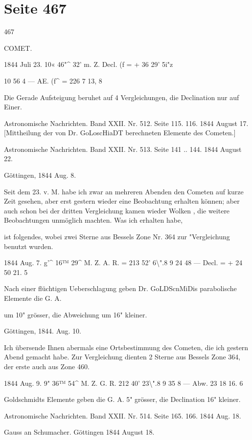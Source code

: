 \documentclass[10pt,a4paper]{article}
\begin{document}
\newpage
\section*{Seite 467}
467

COMET.

1844 Juli 23. 10« 46"\textasciicircum{} 32' m. Z. Decl. (f = + 36\textdegree{} 29' 5i"z

10 56 4 — AE. (f\textasciicircum{} = 226 7 13, 8

Die Gerade Aufsteigung beruhet auf 4 Vergleichungen, die Declination nur auf Einer.

Astronomische Nachrichten. Band XXII. Nr. 512. Seite 115. 116. 1844 August 17. [Mittheilung der von Dr. GoLoscHiaDT berechneten Elemente des Cometen.]

Astronomische Nachrichten. Band XXII. Nr. 513. Seite 141 .. 144. 1844 August 22.

Göttingen, 1844 Aug. 8.

Seit dem 23. v. M. habe ich zwar an mehreren Abenden den Cometen auf kurze Zeit gesehen, aber erst gestern wieder eine Beobachtung erhalten können; aber auch schon bei der dritten Vergleichung kamen wieder Wolken , die weitere Beobachtungen unmöglich machten. Was ich erhalten habe,

ist folgendes, wobei zwei Sterne aus Bessels Zone Nr. 364 zur "Vergleichung benutzt wurden.

1844 Aug. 7. g'\textasciicircum{} 16™ 29\textasciicircum{} M. Z. A. R. = 213\textdegree{} 52' 6\textbackslash{}".8 9 24 48 — Decl. = + 24 50 21. 5

Nach einer flüchtigen Ueberschlagung geben Dr. GoLDScnMiDis parabolische Elemente die G. A.

um 10" grösser, die Abweichung um 16" kleiner.

Göttingen, 1844. Aug. 10.

Ich übersende Ihnen abermals eine Ortsbestimmung des Cometen, die ich gestern Abend gemacht habe. Zur Vergleichung dienten 2 Sterne aus Bessels Zone 364, der erste auch aus Zone 460.

1844 Aug. 9. 9" 36™ 54\textasciicircum{} M. Z. G. R. 212\textdegree{} 40' 23\textbackslash{}".8 9 35 8 — Abw. 23 18 16. 6

Goldschmidts Elemente geben die G. A. 5" grösser, die Declination 16" kleiner.

Astronomische Nachrichten. Band XXII. Nr. 514. Seite 165. 166. 1844 Aug. 18.

Gauss an Schumacher. Göttingen 1844 August 18.
\end{document}
